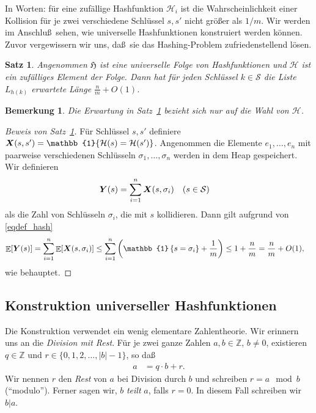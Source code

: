 \documentclass[10pt,reqno]{amsart}
\numberwithin{equation}{section}
\newcommand\cH{\mathcal H}
\newcommand\cS{\mathcal S}
\newcommand\fH{\mathfrak H}
\newcommand\vX{\vec X}
\newcommand\vY{\vec Y}
\newcommand\ZZ{\mathbb Z}
\def\vec#1{\mathchoice{\mbox{\boldmath$\displaystyle#1$}}
{\mbox{\boldmath$\textstyle#1$}}
{\mbox{\boldmath$\scriptstyle#1$}}
{\mbox{\boldmath$\scriptscriptstyle#1$}}}
\DeclareMathOperator{\ex}{\mathbb E}
\newtheorem{remark}[definition]{Bemerkung}
\newtheorem{theorem}[definition]{Satz}
\newcommand{\vecone}{\mathbb{1}}
\newcommand\bc[1]{\left({#1}\right)}
\newcommand\cbc[1]{\left\{{#1}\right\}}
\newcommand\Thm{Satz}
\begin{document}
In Worten: f\"ur eine zuf\"allige Hashfunktion $\cH_i$ ist die Wahrscheinlichkeit einer Kollision f\"ur je zwei verschiedene Schl\"ussel $s,s'$ nicht gr\"o\ss er als $1/m$.
Wir werden im Anschlu\ss\ sehen, wie universelle Hashfunktionen konstruiert werden k\"onnen.
Zuvor vergewissern wir uns, da\ss\ sie das Hashing-Problem zufriedenstellend l\"osen.

\begin{theorem}\label{thm_hash}
	Angenommen $\fH$ ist eine universelle Folge von Hashfunktionen und $\cH$ ist ein zuf\"alliges Element der Folge.
	Dann hat f\"ur jeden Schl\"ussel $k\in\cS$ die Liste $L_{h(k)}$ erwartete L\"ange $\frac nm+O(1)$.
\end{theorem}

\begin{remark}\label{rem_hash}
	Die Erwartung in \Thm~\ref{thm_hash} bezieht sich nur auf die Wahl von $\cH$.
\end{remark}

\begin{proof}[Beweis von \Thm~\ref{thm_hash}]
	F\"ur Schl\"ussel $s,s'$ definiere $\vX(s,s')=\vecone\{\cH(s)=\cH(s')\}$.
	Angenommen die Elemente $e_1,\ldots,e_n$ mit paarweise verschiedenen Schl\"usseln $\sigma_1,\ldots,\sigma_n$ werden in dem Heap gespeichert.
	Wir definieren
	\begin{align*}
		\vY(s)&=\sum_{i=1}^n\vX(s,\sigma_i)&&(s\in\cS)
	\end{align*}
	als die Zahl von Schl\"usseln $\sigma_i$, die mit $s$ kollidieren.
	Dann gilt aufgrund von \eqref{eqdef_hash}
	\begin{align*}
		\ex[\vY(s)]&=\sum_{i=1}^n\ex[\vX(s,\sigma_i)]\leq\sum_{i=1}^n\bc{\vecone\cbc{s=\sigma_i}+\frac1m}\leq1+\frac nm=\frac nm+O(1),
	\end{align*}
	wie behauptet.
\end{proof}

\subsection{Konstruktion universeller Hashfunktionen}\label{sec_uni_constr}
Die Konstruktion verwendet ein wenig elementare Zahlentheorie.
Wir erinnern uns an die {\em Division mit Rest}.
F\"ur je zwei ganze Zahlen $a,b\in\ZZ$, $b\neq0$, existieren $q\in\ZZ$ und $r\in\{0,1,2,\ldots,|b|-1\}$, so da\ss
	\begin{align*}
		a&=q\cdot b+r.
	\end{align*}
Wir nennen $r$ den {\em Rest} von $a$ bei Division durch $b$ und schreiben $r=a\mod b$ (``modulo'').
Ferner sagen wir, $b$ {\em teilt} $a$, falls $r=0$.
In diesem Fall schreiben wir $b|a$.
\end{document}
